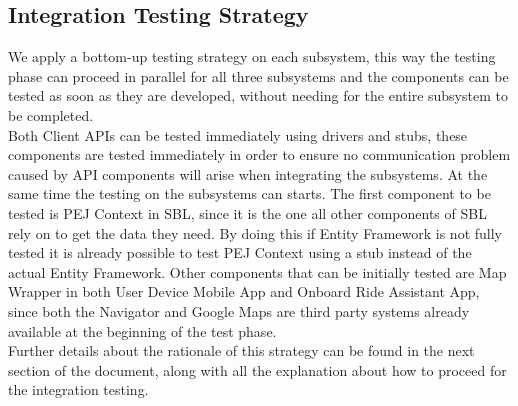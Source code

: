 \subsection{Integration Testing Strategy}
We apply a bottom-up testing strategy on each subsystem, this way the testing phase can proceed in parallel for all three subsystems and the components can be tested as soon as they are developed, without needing for the entire subsystem to be completed.\\
Both Client APIs can be tested immediately using drivers and stubs, these components are tested immediately in order to ensure no communication problem caused by API components will arise when integrating the subsystems. At the same time the testing on the subsystems can starts. The first component to be tested is PEJ Context in SBL, since it is the one all other components of SBL rely on to get the data they need. By doing this if Entity Framework is not fully tested it is already possible to test PEJ Context using a stub instead of the actual Entity Framework. Other components that can be initially tested are Map Wrapper in both User Device Mobile App and Onboard Ride Assistant App, since both the Navigator and Google Maps are third party systems already available at the beginning of the test phase.\\
Further details about the rationale of this strategy can be found in the next section of the document, along with all the explanation about how to proceed for the integration testing.

\begin{comment}
IGNORATE LE SCRITTE IN MAIUSCOLO, LE SISTEMERO'
We apply a bottom-up strategy, 

All SBL components rely on PEJ Context to get the data they need

The system is designed in order to test several components in parallel, 

 
SINTESI:
in parallelo:
API (non vechicle) + SBL interno + APPs interno

SBL:
1-model \& PEJ Context
2-Vehicle Tracker, Speacial Areas Assistant, Payment Processor, account manager
3-Zone Manager terminato il testing delle interfacce di SPA e vehicle tracker
4-Booking Handler terminato il testing di tutte le interfacce precedenti

MOBILE APP:
-seguire navigation route/path da UX per controllare navigabilità view
-test che richiedono dati esterni via API eseguiti sfruttando dati hardcodati

CAR APP:
-idem come mobile app
-il Navigator lo consideriamo già pronto in partenza essendo di terze parti

Integrazione:
non appena pronti i subsystem vengono sostituiti ai mock a cui sono connesse le API; nuovi test
\end{comment}



